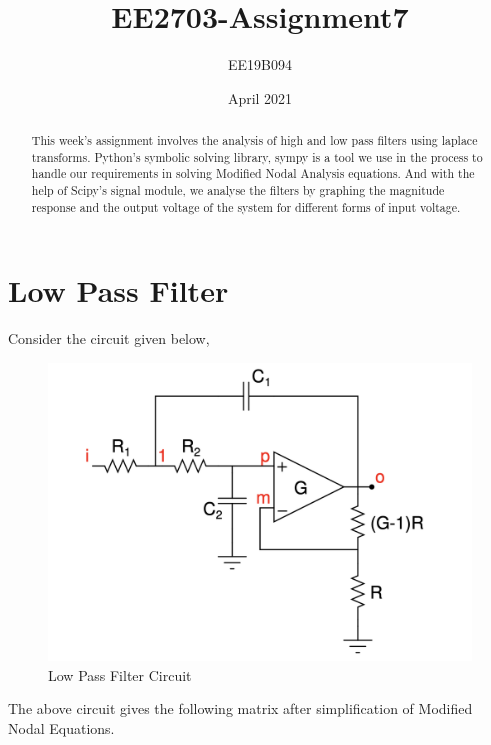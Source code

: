 \documentclass[11pt, a4paper]{article}
\title{EE2703-Assignment7}
\author{EE19B094}
\date{April 2021}
\begin{document}
\maketitle
\newpage

\begin{abstract}
This week's assignment involves the analysis of high and low pass filters using laplace transforms. Python's symbolic solving library, sympy is a tool we use in the process to handle our requirements in solving Modified Nodal Analysis  equations. And with the help of Scipy’s signal module, we analyse the filters by graphing the magnitude response and the output voltage of the system for different forms of input voltage.
\end{abstract}

\section{Low Pass Filter}
Consider the circuit given below,
\begin{figure}[!tbh]
   	\centering
   	\includegraphics[scale=0.5]{low_pass.png}   
   	\caption{Low Pass Filter Circuit}
   	\label{fig:Figure_1}
   \end{figure}
The above circuit gives the following matrix after simplification of Modified Nodal Equations.
\newline
\end{document}
